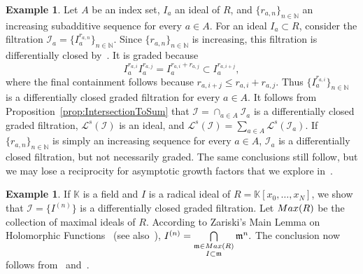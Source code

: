 \documentclass[12pt, reqno]{amsart}
\numberwithin{equation}{section}
\newcommand{\fm}{{\mathfrak m}}
\newcommand{\N}{{\mathbb N}}
\newcommand{\kk}{\mathbb{K}}
\newcommand{\cL}{{\mathcal L}}
\newcommand{\I}{{\mathcal I}}
\theoremstyle{plain} %
\theoremstyle{definition}
\newtheorem{ex}[thm]{Example}
\theoremstyle{remark}
\begin{document}
\begin{ex}\label{ex:subadditivepowers}
	Let $A$ be an index set, $I_a$ an ideal of $R$, and $\{r_{a,n}\}_{n\in\N}$ an increasing subadditive sequence for every $a\in A$.  For an ideal $I_a\subset R$, consider the filtration $\I_a=\{I_a^{r_{a,n}}\}_{n\in\N}$.  Since $\{r_{a,n}\}_{n\in\N}$ is increasing, this filtration is differentially closed by~.  It is graded because
	\[
	I_a^{r_{a,i}}I_a^{r_{a,j}}=I_a^{r_{a,i}+r_{a,j}}\subset I_a^{r_{a,i+j}},
	\]
	where the final containment follows because $r_{a,i+j}\le r_{a,i}+r_{a,j}$.  Thus $\{I_a^{r_{a,i}}\}_{n\in\N}$ is a differentially closed graded filtration for every $a\in A$.  It follows from Proposition~\ref{prop:IntersectionToSum} that $\I=\cap_{a\in A} \I_a$ is a differentially closed graded filtration, $\cL^s(\I)$ is an ideal, and $\cL^s(\I)=\sum_{a\in A} \cL^s(\I_a)$.  If $\{r_{a,n}\}_{n\in\N}$ is simply an increasing sequence for every $a\in A$, $\I_a$ is a differentially closed filtration, but not necessarily graded.  The same conclusions still follow, but we may lose a reciprocity for asymptotic growth factors that we explore in~.
\end{ex}

\begin{ex}\label{ex:ZariskiMainLemmaHolomorphic}
	If $\kk$ is a field and $I$ is a radical ideal of $R=\kk[x_0,\ldots,x_N]$, we show that $\I=\{I^{(n)}\}$ is a differentially closed graded filtration.  Let ${\rm Max}(R)$ be the collection of maximal ideals of $R$.  According to Zariski's Main Lemma on Holomorphic Functions~\cite{Zariski-1949} (see also~\cite[Theorem~2.12]{DDSGHN2018}), $I^{(n)}=\bigcap\limits_{\substack{\fm\in {\rm Max}(R)\\ I\subset \fm}} \fm^n.$  The conclusion now follows from~ and~.
\end{ex}
\end{document}
